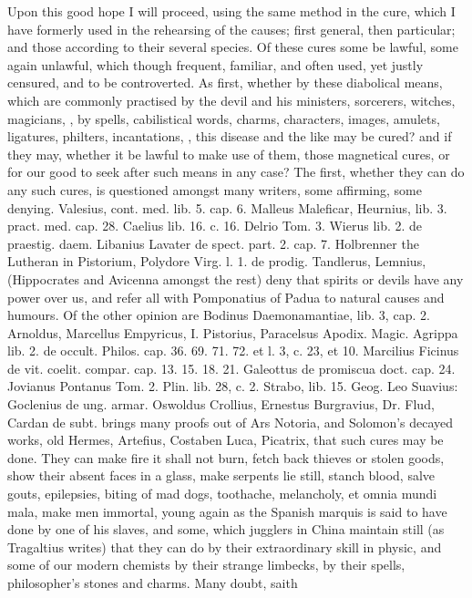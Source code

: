 {Upon this good hope I will proceed, using the same method in the cure,
which I have formerly used in the rehearsing of the causes; first
general, then particular; and those according to their several species.
Of these cures some be lawful, some again unlawful, which though
frequent, familiar, and often used, yet justly censured, and to be
controverted. As first, whether by these diabolical means, which are
commonly practised by the devil and his ministers, sorcerers, witches,
magicians, \etc{}, by spells, cabilistical words, charms, characters,
images, amulets, ligatures, philters, incantations, \etc{}, this disease
and the like may be cured? and if they may, whether it be lawful to
make use of them, those magnetical cures, or for our good to seek after
such means in any case? The first, whether they can do any such cures,
is questioned amongst many writers, some affirming, some denying.
Valesius, cont. med. lib. 5. cap. 6. Malleus Maleficar, Heurnius, lib.
3. pract. med. cap. 28. Caelius lib. 16. c. 16. Delrio Tom. 3. Wierus
lib. 2. de praestig. daem. Libanius Lavater de spect. part. 2. cap. 7.
Holbrenner the Lutheran in Pistorium, Polydore Virg. l. 1. de prodig.
Tandlerus, Lemnius, (Hippocrates and Avicenna amongst the rest) deny
that spirits or devils have any power over us, and refer all with
Pomponatius of Padua to natural causes and humours. Of the other
opinion are Bodinus Daemonamantiae, lib. 3, cap. 2. Arnoldus, Marcellus
Empyricus, I. Pistorius, Paracelsus Apodix. Magic. Agrippa lib. 2. de
occult. Philos. cap. 36. 69. 71. 72. et l. 3, c. 23, et 10. Marcilius
Ficinus de vit. coelit. compar. cap. 13. 15. 18. 21. \etc{} Galeottus de
promiscua doct. cap. 24. Jovianus Pontanus Tom. 2. Plin. lib. 28, c. 2.
Strabo, lib. 15. Geog. Leo Suavius: Goclenius de ung. armar. Oswoldus
Crollius, Ernestus Burgravius, Dr. Flud, \etc{} Cardan de subt. brings
many proofs out of Ars Notoria, and Solomon's decayed works, old
Hermes, Artefius, Costaben Luca, Picatrix, \etc{} that such cures may be
done. They can make fire it shall not burn, fetch back thieves or
stolen goods, show their absent faces in a glass, make serpents lie
still, stanch blood, salve gouts, epilepsies, biting of mad dogs,
toothache, melancholy, et omnia mundi mala, make men immortal, young
again as the Spanish marquis is said to have done by one of his
slaves, and some, which jugglers in China maintain still (as
Tragaltius writes) that they can do by their extraordinary skill in
physic, and some of our modern chemists by their strange limbecks, by
their spells, philosopher's stones and charms. Many doubt, saith
}
